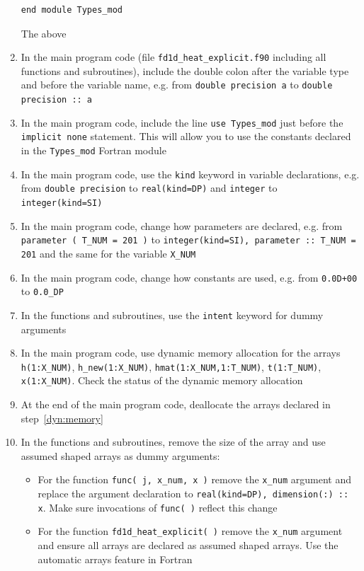 \documentclass[12pt]{article}
\begin{document}
\begin{enumerate}
\begin{verbatim}
end module Types_mod
\end{verbatim}
The above\label{mod:temp}
\item In the main program code (file \texttt{fd1d\_heat\_explicit.f90} including all functions and subroutines), include the double colon after the variable type and before 
the variable name, e.g. from \texttt{double precision a} to \texttt{double precision :: a}
\item In the main program code, include the line \texttt{use Types\_mod} just before
the \texttt{implicit none} statement. This will allow you to use the constants declared in the
\texttt{Types\_mod} Fortran module
\item In the main program code, use the \texttt{kind} keyword in variable declarations, e.g.
from \texttt{double precision} to \texttt{real(kind=DP)} and \texttt{integer} to 
\texttt{integer(kind=SI)}
\item In the main program code, change how parameters are declared, e.g. from 
\texttt{parameter ( T\_NUM = 201 )} to \texttt{integer(kind=SI), parameter :: T\_NUM = 201} and the
same for the variable \texttt{X\_NUM}
\item In the main program code, change how constants are used, e.g. from \texttt{0.0D+00} to 
\texttt{0.0\_DP}
\item In the functions and subroutines, use the \texttt{intent} keyword for dummy arguments
\item In the main program code, use dynamic memory allocation for the arrays \texttt{h(1:X\_NUM)}, 
\texttt{h\_new(1:X\_NUM)}, \texttt{hmat(1:X\_NUM,1:T\_NUM)}, \texttt{t(1:T\_NUM)}, \texttt{x(1:X\_NUM)}. Check
the status of the dynamic memory allocation\label{dyn:memory}
\item At the end of the main program code, deallocate the arrays declared in step~\ref{dyn:memory}
\item In the functions and subroutines, remove the size of the array and use assumed shaped
arrays as dummy arguments:
\begin{itemize}
\item For the function \texttt{func( j, x\_num, x )} remove the \texttt{x\_num} argument and
replace the argument declaration to \texttt{real(kind=DP), dimension(:) :: x}. Make sure
invocations of \texttt{func( )} reflect this change
\item For the function \texttt{fd1d\_heat\_explicit( )} remove the \texttt{x\_num} argument
and ensure all arrays are declared as assumed shaped arrays. Use the automatic arrays feature in Fortran

\end{itemize}
\end{enumerate}
\end{document}
